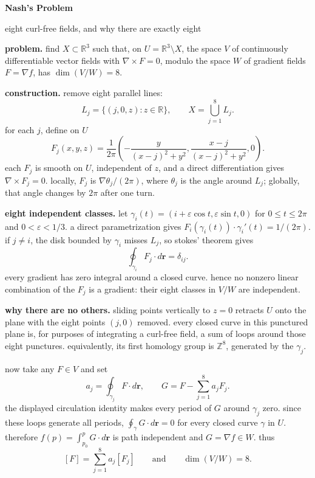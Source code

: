 \documentclass[11pt]{article}
\begin{document}
\begin{center}
{\LARGE\bfseries Nash's Problem}\par
{\large eight curl-free fields, and why there are exactly eight}\par
\end{center}

\textbf{problem.} find $X\subset\mathbb R^3$ such that, on $U=\mathbb R^3\setminus X$, the space $V$ of continuously differentiable vector fields with $\nabla\times F=0$, modulo the space $W$ of gradient fields $F=\nabla f$, has $\dim(V/W)=8$.

\textbf{construction.} remove eight parallel lines:
\[
L_j=\{(j,0,z):z\in\mathbb R\},\qquad
X=\bigcup_{j=1}^{8}L_j.
\]
for each $j$, define on $U$
\[
F_j(x,y,z)=\frac{1}{2\pi}
\left(
-\frac{y}{(x-j)^2+y^2},
\frac{x-j}{(x-j)^2+y^2},
0
\right).
\]
each $F_j$ is smooth on $U$, independent of $z$, and a direct differentiation gives $\nabla\times F_j=0$. locally, $F_j$ is $\nabla\theta_j/(2\pi)$, where $\theta_j$ is the angle around $L_j$; globally, that angle changes by $2\pi$ after one turn.

\textbf{eight independent classes.} let $\gamma_i(t)=(i+\varepsilon\cos t,\varepsilon\sin t,0)$ for $0\le t\le2\pi$ and $0<\varepsilon<1/3$. a direct parametrization gives $F_i(\gamma_i(t))\cdot\gamma_i'(t)=1/(2\pi)$. if $j\ne i$, the disk bounded by $\gamma_i$ misses $L_j$, so stokes' theorem gives
\[
\oint_{\gamma_i}F_j\cdot d\mathbf r=\delta_{ij}.
\]
every gradient has zero integral around a closed curve. hence no nonzero linear combination of the $F_j$ is a gradient: their eight classes in $V/W$ are independent.

\textbf{why there are no others.} sliding points vertically to $z=0$ retracts $U$ onto the plane with the eight points $(j,0)$ removed. every closed curve in this punctured plane is, for purposes of integrating a curl-free field, a sum of loops around those eight punctures. equivalently, its first homology group is $\mathbb Z^8$, generated by the $\gamma_j$.

now take any $F\in V$ and set
\[
a_j=\oint_{\gamma_j}F\cdot d\mathbf r,
\qquad
G=F-\sum_{j=1}^{8}a_jF_j.
\]
the displayed circulation identity makes every period of $G$ around $\gamma_j$ zero. since these loops generate all periods, $\oint_\gamma G\cdot d\mathbf r=0$ for every closed curve $\gamma$ in $U$. therefore $f(p)=\int_{p_0}^{p}G\cdot d\mathbf r$ is path independent and $G=\nabla f\in W$. thus
\[
[F]=\sum_{j=1}^{8}a_j[F_j]
\qquad\text{and}\qquad
\boxed{\dim(V/W)=8}.
\]
\end{document}
